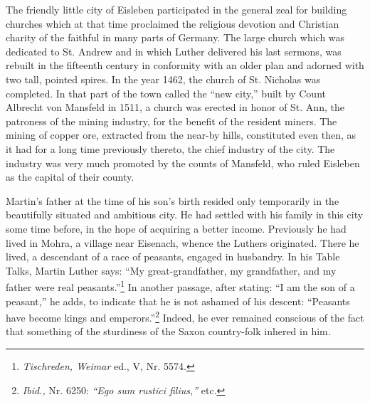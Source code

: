 The friendly little city of Eisleben participated in the general zeal
for building churches which at that time proclaimed the religious devotion and Christian charity of the faithful in many parts of Germany. The large church which was dedicated to St. Andrew and in which Luther delivered his last sermons,
was rebuilt in the fifteenth century in conformity with an older plan and adorned with two tall,
pointed spires. In the year 1462, the church of St. Nicholas was completed. In that part of the town called the “new city,” built by Count
Albrecht von Mansfeld in 1511, a church was erected in honor of St.
Ann, the patroness of the mining industry, for the benefit of the
resident miners. The mining of copper ore, extracted from the near-by
hills, constituted even then, as it had for a long time previously thereto,
the chief industry of the city. The industry was very much promoted
by the counts of Mansfeld, who ruled Eisleben as the capital of their
county.

Martin’s father at the time of his son’s birth resided only temporarily in the beautifully situated and ambitious city.
He had settled with his family in this city some time before, in the hope of acquiring a better income.
Previously he had lived in Mohra, a village near Eisenach, whence the Luthers originated.
There he lived, a descendant of a race of peasants, engaged in husbandry.
In his Table Talks, Martin Luther says: “My great-grandfather, my grandfather,
and my father were real peasants.”\footnote{\textit{Tischreden, Weimar} ed., V, Nr. 5574.}
In another passage, after stating:
“I am the son of a peasant,” he adds, to indicate that he is not ashamed
of his descent: “Peasants have become kings and emperors.”\footnote{\textit{Ibid.,} Nr. 6250: \textit{“Ego sum rustici filius,”} etc.}
Indeed, he ever remained conscious of the fact that something of the sturdiness of the Saxon country-folk inhered in him.

